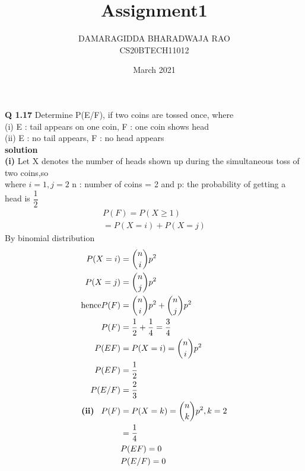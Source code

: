 \documentclass{article}
\title{Assignment1}
\author{DAMARAGIDDA BHARADWAJA RAO\\CS20BTECH11012}
\date{March 2021}
\begin{document}
\maketitle
\begin{multicols*}{2}
\noindent
\textbf{Q 1.17} Determine P(E/F), if two coins are tossed
once, where\\
(i) E : tail appears on one coin, F : one coin
shows head\\
\vspace{0.5cm}
(ii) E : no tail appears, F : no head appears\\
\textbf{solution}\\
\textbf{(i)} Let X denotes the number of heads shown up during the simultaneous toss of two coins,so \\
where $ i = 1,j = 2 $  n : number of coins = 2 and p: the probability of getting a head is $\dfrac{1}{2}$
\begin{multline*}
P(F)=P(X\geq 1)\\
=P(X=i)+P(X=j)
\end{multline*}
By binomial distribution
\begin{align*}
P(X=i)&=\binom{n}{i} p ^2\\
P(X=j)&=\binom{n}{j} p ^2\\
\text{hence} P(F) &= \binom{n}{i} p ^2 + \binom{n}{j} p ^2\\
P(F) &= \frac{1}{2} + \frac{1}{4} = \frac{3}{4}\\
P(EF) &= P(X=i)=\binom{n}{i} p ^2\\
P(EF) &= \frac{1}{2}\\
P(E/F) &= \frac{2}{3}\\
\textbf{(ii)}\hspace{0.3cm}P(F) &=P(X=k)= \binom{n}{k} p^2, k = 2\\
& = \frac{1}{4}\\
&P(EF) = 0\\
&P(E/F) = 0
\end{align*}
\end{multicols*}
\end{document}
